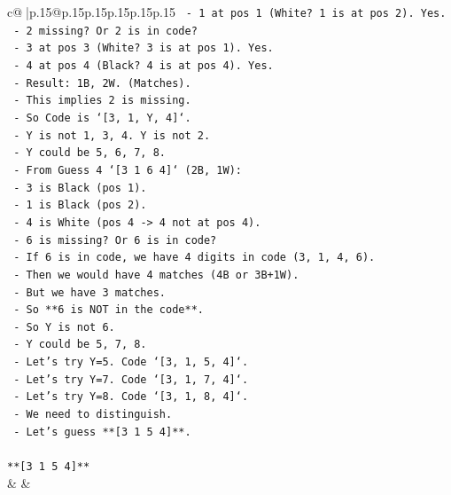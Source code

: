 \documentclass{article}
\begin{document}
{\begin{supertabular}{c@{$\;$}|p{.15\linewidth}@{}p{.15\linewidth}p{.15\linewidth}p{.15\linewidth}p{.15\linewidth}p{.15\linewidth}}
{{{\texttt{        {-} 1 at pos 1 (White? 1 is at pos 2). Yes.} \\
\texttt{        {-} 2 missing? Or 2 is in code?} \\
\texttt{        {-} 3 at pos 3 (White? 3 is at pos 1). Yes.} \\
\texttt{        {-} 4 at pos 4 (Black? 4 is at pos 4). Yes.} \\
\texttt{        {-} Result: 1B, 2W. (Matches).} \\
\texttt{        {-} This implies 2 is missing.} \\
\texttt{      {-} So Code is `{[}3, 1, Y, 4{]}`.} \\
\texttt{      {-} Y is not 1, 3, 4. Y is not 2.} \\
\texttt{      {-} Y could be 5, 6, 7, 8.} \\
\texttt{      {-} From Guess 4 `{[}3 1 6 4{]}` (2B, 1W):} \\
\texttt{        {-} 3 is Black (pos 1).} \\
\texttt{        {-} 1 is Black (pos 2).} \\
\texttt{        {-} 4 is White (pos 4 {-}> 4 not at pos 4).} \\
\texttt{        {-} 6 is missing? Or 6 is in code?} \\
\texttt{        {-} If 6 is in code, we have 4 digits in code (3, 1, 4, 6).} \\
\texttt{        {-} Then we would have 4 matches (4B or 3B+1W).} \\
\texttt{        {-} But we have 3 matches.} \\
\texttt{        {-} So **6 is NOT in the code**.} \\
\texttt{      {-} So Y is not 6.} \\
\texttt{      {-} Y could be 5, 7, 8.} \\
\texttt{      {-} Let's try Y=5. Code `{[}3, 1, 5, 4{]}`.} \\
\texttt{      {-} Let's try Y=7. Code `{[}3, 1, 7, 4{]}`.} \\
\texttt{      {-} Let's try Y=8. Code `{[}3, 1, 8, 4{]}`.} \\
\texttt{      {-} We need to distinguish.} \\
\texttt{      {-} Let's guess **{[}3 1 5 4{]}**.} \\
\\ 
\texttt{**{[}3 1 5 4{]}**} \\
            }
        }
    }
    & & \\ \\


\end{supertabular}}
\end{document}
